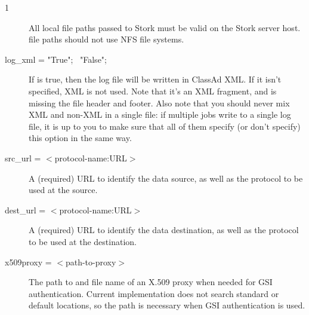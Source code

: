 \begin{ManPage}{\label{man-stork-submit}}{1}
\begin{description}
All local file paths passed to Stork must be valid on the Stork server host.
 file paths should not use NFS file systems.

\item[log\_xml = "True"; \Bar\ "False";]
If  is true, 
then the log file will be written in ClassAd XML. If it isn't
specified, XML is not used. Note that it's an XML fragment, and is
missing the file header and footer. Also note that you should never
mix XML and non-XML in a single file: if multiple jobs write to a
single log file, it is up to you to make sure that all of them specify
(or don't specify) this option in the same way.
\item[src\_url = $<$protocol-name:URL$>$]
A (required) URL to identify the data source, 
as well as the protocol to be used at the source.

\item[dest\_url = $<$protocol-name:URL$>$]
A (required) URL to identify the data destination, 
as well as the protocol to be used at the destination.



\item[x509proxy = $<$path-to-proxy$>$]
The path to and file name of an X.509 proxy when needed
for GSI authentication.
Current implementation does not search standard or default locations,
so the path is necessary when GSI authentication is used.



\end{description}
\end{ManPage}
